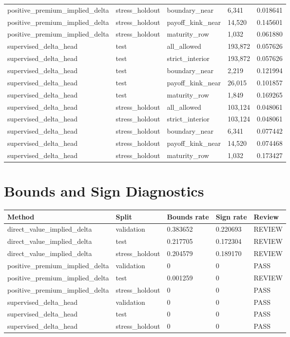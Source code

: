 \documentclass[11pt,a4paper]{article}
\begin{document}
\begin{longtable}{L{0.25\textwidth} L{0.16\textwidth} L{0.19\textwidth} L{0.12\textwidth} L{0.13\textwidth}}
positive\_premium\_implied\_delta & stress\_holdout & boundary\_near & 6,341 & 0.018641 \\
positive\_premium\_implied\_delta & stress\_holdout & payoff\_kink\_near & 14,520 & 0.145601 \\
positive\_premium\_implied\_delta & stress\_holdout & maturity\_row & 1,032 & 0.061880 \\
supervised\_delta\_head & test & all\_allowed & 193,872 & 0.057626 \\
supervised\_delta\_head & test & strict\_interior & 193,872 & 0.057626 \\
supervised\_delta\_head & test & boundary\_near & 2,219 & 0.121994 \\
supervised\_delta\_head & test & payoff\_kink\_near & 26,015 & 0.101857 \\
supervised\_delta\_head & test & maturity\_row & 1,849 & 0.169265 \\
supervised\_delta\_head & stress\_holdout & all\_allowed & 103,124 & 0.048061 \\
supervised\_delta\_head & stress\_holdout & strict\_interior & 103,124 & 0.048061 \\
supervised\_delta\_head & stress\_holdout & boundary\_near & 6,341 & 0.077442 \\
supervised\_delta\_head & stress\_holdout & payoff\_kink\_near & 14,520 & 0.074468 \\
supervised\_delta\_head & stress\_holdout & maturity\_row & 1,032 & 0.173427 \\
\bottomrule
\end{longtable}

\section{Bounds and Sign Diagnostics}

\begin{longtable}{L{0.28\textwidth} L{0.16\textwidth} L{0.16\textwidth} L{0.16\textwidth} L{0.12\textwidth}}
\toprule
Method & Split & Bounds rate & Sign rate & Review \\
\midrule
\endhead
direct\_value\_implied\_delta & validation & 0.383652 & 0.220693 & REVIEW \\
direct\_value\_implied\_delta & test & 0.217705 & 0.172304 & REVIEW \\
direct\_value\_implied\_delta & stress\_holdout & 0.204579 & 0.189170 & REVIEW \\
positive\_premium\_implied\_delta & validation & 0 & 0 & PASS \\
positive\_premium\_implied\_delta & test & 0.001259 & 0 & REVIEW \\
positive\_premium\_implied\_delta & stress\_holdout & 0 & 0 & PASS \\
supervised\_delta\_head & validation & 0 & 0 & PASS \\
supervised\_delta\_head & test & 0 & 0 & PASS \\
supervised\_delta\_head & stress\_holdout & 0 & 0 & PASS \\
\bottomrule
\end{longtable}
\end{document}
